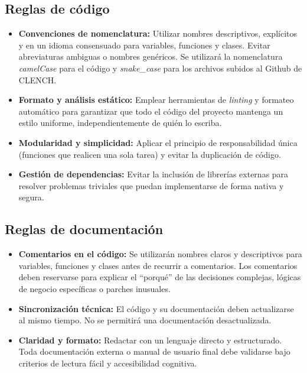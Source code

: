 \subsection{Reglas de código}
\begin{itemize}[leftmargin=*]
  \item \textbf{Convenciones de nomenclatura:} Utilizar nombres descriptivos, explícitos y en un idioma consensuado para variables, funciones y clases. Evitar abreviaturas ambiguas o nombres genéricos. Se utilizará la nomenclatura \textit{camelCase} para el código y \textit{snake\_case} para los archivos subidos al Github de CLENCH.
  \item \textbf{Formato y análisis estático:} Emplear herramientas de \textit{linting} y formateo automático para garantizar que todo el código del proyecto mantenga un estilo uniforme, independientemente de quién lo escriba.
  \item \textbf{Modularidad y simplicidad:} Aplicar el principio de responsabilidad única (funciones que realicen una sola tarea) y evitar la duplicación de código.
  \item \textbf{Gestión de dependencias:} Evitar la inclusión de librerías externas para resolver problemas triviales que puedan implementarse de forma nativa y segura.
\end{itemize}

\subsection{Reglas de documentación}
\begin{itemize}[leftmargin=*]
  \item \textbf{Comentarios en el código:} Se utilizarán nombres claros y descriptivos para variables, funciones y clases antes de recurrir a comentarios. Los comentarios deben reservarse para explicar el ``porqué'' de las decisiones complejas, lógicas de negocio específicas o parches inusuales.
  \item \textbf{Sincronización técnica:} El código y su documentación deben actualizarse al mismo tiempo. No se permitirá una documentación desactualizada.
  \item \textbf{Claridad y formato:} Redactar con un lenguaje directo y estructurado. Toda documentación externa o manual de usuario final debe validarse bajo criterios de lectura fácil y accesibilidad cognitiva.
\end{itemize}

